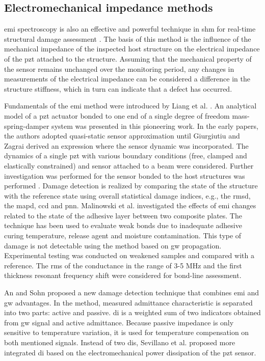 \documentclass[11pt,a4paper,final]{report}
\begin{document}
\subsection{Electromechanical impedance methods}
\Ac{emi} spectroscopy is also an effective and powerful technique in \ac{shm} for real-time structural damage assessment \cite{park2003overview}.
The basis of this method is the influence of the mechanical impedance of the inspected host structure on the electrical impedance of the \ac{pzt} attached to the structure.
Assuming that the mechanical property of the sensor remains unchanged over the monitoring period, any changes in measurements of the electrical impedance can be considered a difference in the structure stiffness, which in turn can indicate that a defect has occurred.

Fundamentals of the \ac{emi} method were introduced by Liang et al. \cite{liang1994impedance}.
An analytical model of a \ac{pzt} actuator bonded to one end of a single degree of freedom mass-spring-damper system was presented in this pioneering work.
In the early papers, the authors adopted quasi-static sensor approximation until  Giurgiutiu and Zagrai \cite{giurgiutiu2000characterization} derived an expression where the sensor dynamic was incorporated.
The dynamics of a single \ac{pzt} with various boundary conditions (free, clamped and elastically constrained) and sensor attached to a beam were considered.
Further investigation was performed for the sensor bonded to the host structures was performed \cite{zagrai2001electro, giurgiutiu2005damage}.
Damage detection is realized by comparing the state of the structure with the reference state using overall statistical damage indices, e.g., the \ac{rmsd}, the \ac{mapd}, \ac{ccd} and \ac{pnn}.
Malinowski et al. \cite{malinowski2014characterisation, malinowski2015use} investigated the effects of \ac{emi} changes related to the state of the adhesive layer between two composite plates.
The technique has been used to evaluate weak bonds due to inadequate adhesive curing temperature, release agent and moisture contamination. This type of damage is not detectable using the method based on \ac{gw} propagation.
Experimental testing was conducted on weakened samples and compared with a reference.
The \ac{rms} of the conductance in the range of 3-5 MHz and the first thickness resonant frequency shift were considered for bond-line assessment.

An and Sohn \cite{an2012integrated} proposed a new damage detection technique that combines \ac{emi} and \ac{gw} advantages.
In the method, measured admittance characteristic is separated into two parts: active and passive.
\Ac{di} is a weighted sum of two indicators obtained from \ac{gw} signal and active admittance.
Because passive impedance is only sensitive to temperature variation, it is used for temperature compensation on both mentioned signals.
Instead of two \acp{di}, Sevillano et al. \cite{sevillano2016damage} proposed more integrated \ac{di} based on the electromechanical power dissipation of the \ac{pzt} sensor.
\end{document}
